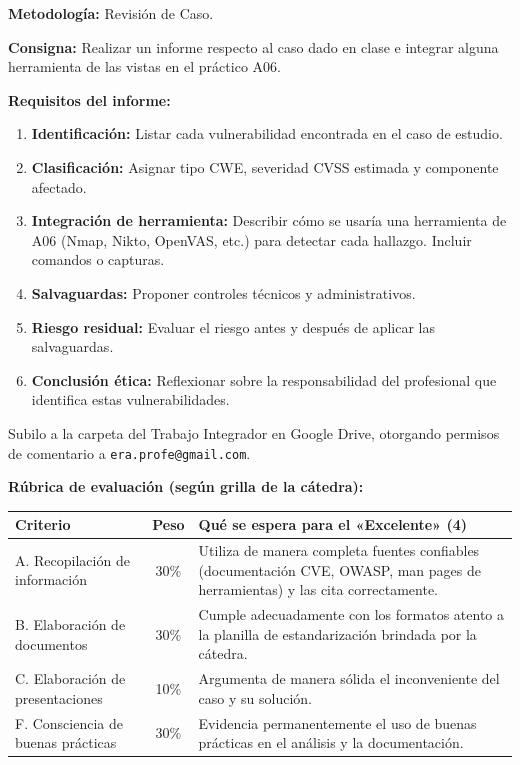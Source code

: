 \documentclass[11pt,a4paper]{article}
\begin{document}
\begin{clave}
\textbf{Metodología:} Revisión de Caso.

\textbf{Consigna:} Realizar un informe respecto al caso dado en clase e integrar alguna herramienta de las vistas en el práctico A06.

\textbf{Requisitos del informe:}
\begin{enumerate}
  \item \textbf{Identificación:} Listar cada vulnerabilidad encontrada en el caso de estudio.
  \item \textbf{Clasificación:} Asignar tipo CWE, severidad CVSS estimada y componente afectado.
  \item \textbf{Integración de herramienta:} Describir cómo se usaría una herramienta de A06 (Nmap, Nikto, OpenVAS, etc.) para detectar cada hallazgo. Incluir comandos o capturas.
  \item \textbf{Salvaguardas:} Proponer controles técnicos y administrativos.
  \item \textbf{Riesgo residual:} Evaluar el riesgo antes y después de aplicar las salvaguardas.
  \item \textbf{Conclusión ética:} Reflexionar sobre la responsabilidad del profesional que identifica estas vulnerabilidades.
\end{enumerate}

Subilo a la carpeta del Trabajo Integrador en Google Drive, otorgando permisos de comentario a \texttt{era.profe@gmail.com}.
\end{clave}

\textbf{Rúbrica de evaluación (según grilla de la cátedra):}
\begin{center}
\renewcommand{\arraystretch}{1.2}
\begin{tabularx}{\textwidth}{@{} l c X @{}}
\toprule
\textbf{Criterio} & \textbf{Peso} & \textbf{Qué se espera para el «Excelente» (4)} \\
\midrule
A. Recopilación de información & 30\% & Utiliza de manera completa fuentes confiables (documentación CVE, OWASP, man pages de herramientas) y las cita correctamente. \\
B. Elaboración de documentos & 30\% & Cumple adecuadamente con los formatos atento a la planilla de estandarización brindada por la cátedra. \\
C. Elaboración de presentaciones & 10\% & Argumenta de manera sólida el inconveniente del caso y su solución. \\
F. Consciencia de buenas prácticas & 30\% & Evidencia permanentemente el uso de buenas prácticas en el análisis y la documentación. \\
\bottomrule
\end{tabularx}
\end{center}
\end{document}
